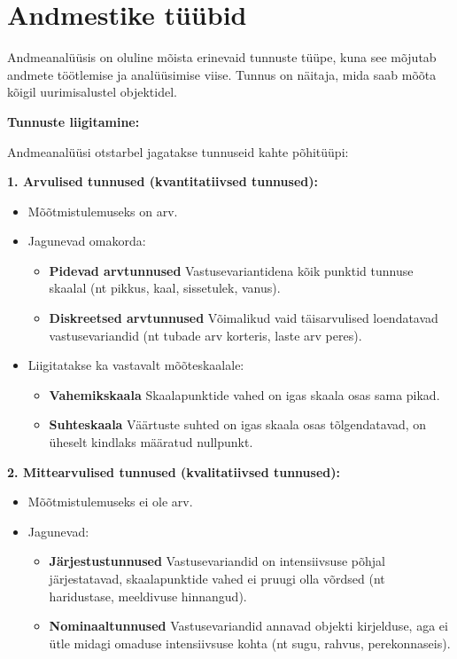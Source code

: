\documentclass[
]{book}
\providecommand{\tightlist}{%
  \setlength{\itemsep}{0pt}\setlength{\parskip}{0pt}}
\begin{document}
\section{Andmestike tüübid}\label{andmestike-tuxfcuxfcbid}

Andmeanalüüsis on oluline mõista erinevaid tunnuste tüüpe, kuna see mõjutab andmete töötlemise ja analüüsimise viise. Tunnus on näitaja, mida saab mõõta kõigil uurimisalustel objektidel.

\textbf{Tunnuste liigitamine:}

Andmeanalüüsi otstarbel jagatakse tunnuseid kahte põhitüüpi:

\textbf{1. Arvulised tunnused (kvantitatiivsed tunnused):}

\begin{itemize}
\tightlist
\item
  Mõõtmistulemuseks on arv.
\item
  Jagunevad omakorda:

  \begin{itemize}
  \tightlist
  \item
    \textbf{Pidevad arvtunnused} Vastusevariantidena kõik punktid tunnuse skaalal (nt pikkus, kaal, sissetulek, vanus).
  \item
    \textbf{Diskreetsed arvtunnused} Võimalikud vaid täisarvulised loendatavad vastusevariandid (nt tubade arv korteris, laste arv peres).
  \end{itemize}
\item
  Liigitatakse ka vastavalt mõõteskaalale:

  \begin{itemize}
  \tightlist
  \item
    \textbf{Vahemikskaala} Skaalapunktide vahed on igas skaala osas sama pikad.
  \item
    \textbf{Suhteskaala} Väärtuste suhted on igas skaala osas tõlgendatavad, on üheselt kindlaks määratud nullpunkt.
  \end{itemize}
\end{itemize}

\textbf{2. Mittearvulised tunnused (kvalitatiivsed tunnused):}

\begin{itemize}
\tightlist
\item
  Mõõtmistulemuseks ei ole arv.
\item
  Jagunevad:

  \begin{itemize}
  \tightlist
  \item
    \textbf{Järjestustunnused} Vastusevariandid on intensiivsuse põhjal järjestatavad, skaalapunktide vahed ei pruugi olla võrdsed (nt haridustase, meeldivuse hinnangud).
  \item
    \textbf{Nominaaltunnused} Vastusevariandid annavad objekti kirjelduse, aga ei ütle midagi omaduse intensiivsuse kohta (nt sugu, rahvus, perekonnaseis).
  \end{itemize}
\end{itemize}
\end{document}
